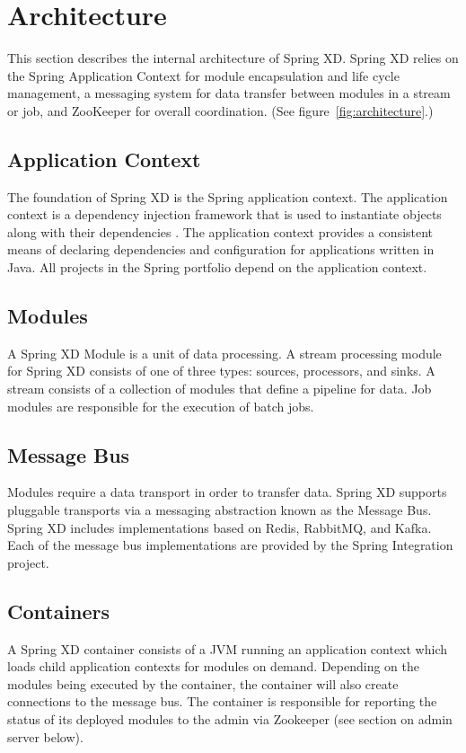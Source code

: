 \section{Architecture}
This section describes the internal architecture of Spring XD. Spring XD
relies on the Spring Application Context for module encapsulation and
life cycle management, a messaging system for data
transfer between modules in a stream or job, and ZooKeeper for overall
coordination. (See figure~\ref{fig:architecture}.)

\subsection{Application Context}
The foundation of Spring XD is the Spring application context. The application
context is a dependency injection framework that is used to instantiate
objects along with their dependencies \cite{spring-framework-reference}.
The application context provides a consistent means of declaring dependencies
and configuration for applications written in Java. All projects in the
Spring portfolio depend on the application context.

\subsection{Modules}
A Spring XD Module is a unit of data processing. A stream processing module
for Spring XD consists of one of three types: sources, processors, and sinks.
A stream consists of a collection of modules that define a pipeline for data. 
Job modules are responsible for the execution of batch jobs.

\subsection{Message Bus}
Modules require a data transport in order to transfer data. Spring XD
supports pluggable transports via a messaging abstraction known as 
the Message Bus. Spring XD includes implementations based on Redis, RabbitMQ,
and Kafka. Each of the message bus implementations are provided by the
Spring Integration project.

\subsection{Containers}
A Spring XD container consists of a JVM running an application context which
loads child application contexts for modules on demand. Depending on the modules
being executed by the container, the container will also create connections to
the message bus. The container is responsible for reporting the status of its deployed
modules to the admin via Zookeeper (see section on admin server below).

